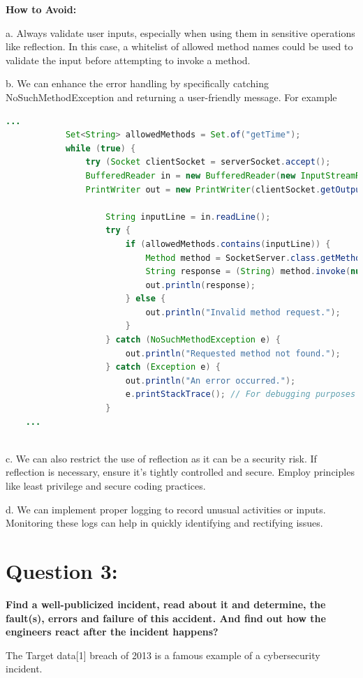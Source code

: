 \documentclass[12pt]{article}
\numberwithin{table}{section}
\begin{document}
\textbf{How to Avoid: } 

a. Always validate user inputs, especially when using them in sensitive operations like reflection. In this case, a whitelist of allowed method names could be used to validate the input before attempting to invoke a method.

b. We can enhance the error handling by specifically catching NoSuchMethodException and returning a user-friendly message. For example
\begin{lstlisting}[language=Java]
	...
			Set<String> allowedMethods = Set.of("getTime");
			while (true) {
				try (Socket clientSocket = serverSocket.accept();
				BufferedReader in = new BufferedReader(new InputStreamReader(clientSocket.getInputStream()));
				PrintWriter out = new PrintWriter(clientSocket.getOutputStream(), true);) {
					
					String inputLine = in.readLine();
					try {
						if (allowedMethods.contains(inputLine)) {
							Method method = SocketServer.class.getMethod(inputLine);
							String response = (String) method.invoke(null);
							out.println(response);
						} else {
							out.println("Invalid method request.");
						}
					} catch (NoSuchMethodException e) {
						out.println("Requested method not found.");
					} catch (Exception e) {
						out.println("An error occurred.");
						e.printStackTrace(); // For debugging purposes
					}
	...
	
\end{lstlisting} 

c. We can also restrict the use of reflection as it can be a security risk. If reflection is necessary, ensure it's tightly controlled and secure. Employ principles like least privilege and secure coding practices.

d. We can implement proper logging to record unusual activities or inputs. Monitoring these logs can help in quickly identifying and rectifying issues.

\section*{Question 3: } 

\textbf{Find a well-publicized incident, read about it and determine, the fault(s), errors and failure of this accident. And find out how the engineers react after the incident happens?}

The Target data[1] breach of 2013 is a famous example of a cybersecurity incident.
\end{document}
